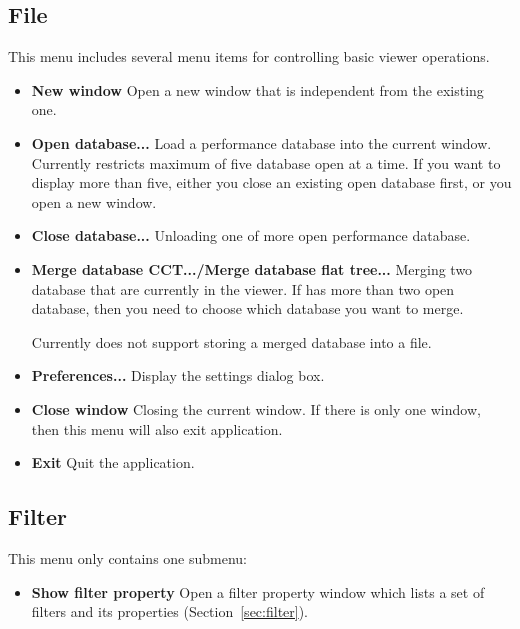 \subsection{File}
This menu includes several menu items for controlling basic viewer operations.
\begin{itemize}
\item \textbf{New window}
  Open a new \hpcviewer{} window that is independent from the existing one.

\item \textbf{Open database...}
  Load a performance database into the current \hpcviewer{} window. 
Currently \hpcviewer{} restricts maximum of five database open at a time. 
If you want to display more than five, either you close an existing open database first, or you open a new \hpcviewer{} window.

\item \textbf{Close database...}
  Unloading one of more open performance database.

\item \textbf{Merge database CCT.../Merge database flat tree...}
  Merging two database that are currently in the viewer. If \hpcviewer{} has more than two
open database, then you need to choose which database you want to merge.

Currently \hpcviewer{} does not support storing a merged database into a file.

\item \textbf{Preferences...}
  Display the settings dialog box.

\item \textbf{Close window}
  Closing the current window. If there is only one window, then this menu will also exit \hpcviewer{} application.

\item \textbf{Exit}
  Quit the \hpcviewer{} application.

\end{itemize}


\subsection{Filter}
This menu only contains one submenu:
\begin{itemize}
 \item \textbf{Show filter property}
  Open a filter property window which lists a set of filters and its properties (Section~\ref{sec:filter}).
\end{itemize}

